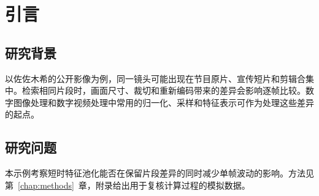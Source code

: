 \chapter{引言}
\label{chap:introduction}

\section{研究背景}

以佐佐木希的公开影像为例，同一镜头可能出现在节目原片、宣传短片和剪辑合集中。检索相同片段时，画面尺寸、裁切和重新编码带来的差异会影响逐帧比较。数字图像处理和数字视频处理中常用的归一化、采样和特征表示可作为处理这些差异的起点\cite{gonzalez2018,tekalp2015}。

\section{研究问题}

本示例考察短时特征池化能否在保留片段差异的同时减少单帧波动的影响。方法见第~\ref{chap:methods}~章，附录给出用于复核计算过程的模拟数据。
